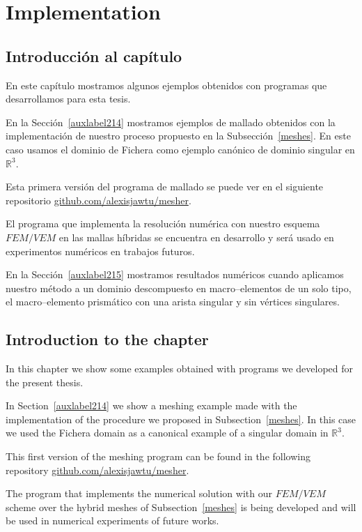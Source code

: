 \chapter{Implementation}

\section*{Introducci\'on al cap\'itulo}
En este cap\'itulo mostramos algunos ejemplos obtenidos 
con programas que desarrollamos para esta tesis.

En la Secci\'on~\ref{auxlabel214} mostramos ejemplos de mallado 
obtenidos con la implementaci\'on de nuestro proceso propuesto 
en la Subsecci\'on~\ref{meshes}. 
En este caso usamos el dominio de Fichera como ejemplo can\'onico 
de dominio singular en $\mathbb{R}^3$.

Esta primera versi\'on del programa de mallado se puede ver en el siguiente 
repositorio \href{https://github.com/alexisjawtu/mesher}{github.com/alexisjawtu/mesher}.

El programa que implementa la resoluci\'on num\'erica con nuestro esquema
$FEM/VEM$ en las mallas h\'ibridas se encuentra en desarrollo y ser\'a
usado en experimentos num\'ericos en trabajos futuros.

En la Secci\'on~\ref{auxlabel215} mostramos resultados num\'ericos
cuando aplicamos nuestro m\'etodo a un dominio descompuesto en macro--elementos
de un solo tipo, el macro--elemento prism\'atico con una arista singular y sin v\'ertices
singulares.

\section*{Introduction to the chapter}
In this chapter we show some examples obtained with programs we 
developed for the present thesis.

In Section~\ref{auxlabel214} we show a meshing example made with the implementation
of the procedure we proposed in Subsection~\ref{meshes}. In this case we used
the Fichera domain as a canonical example of a singular domain in $\mathbb{R}^3$.

This first version of the meshing program can be found in the following repository
\href{https://github.com/alexisjawtu/mesher}{github.com/alexisjawtu/mesher}.

\cite{aaalexis}

The program that implements the numerical solution with our $FEM/VEM$ scheme
over the hybrid meshes of Subsection~\ref{meshes} is being developed and will
be used in numerical experiments of future works.

